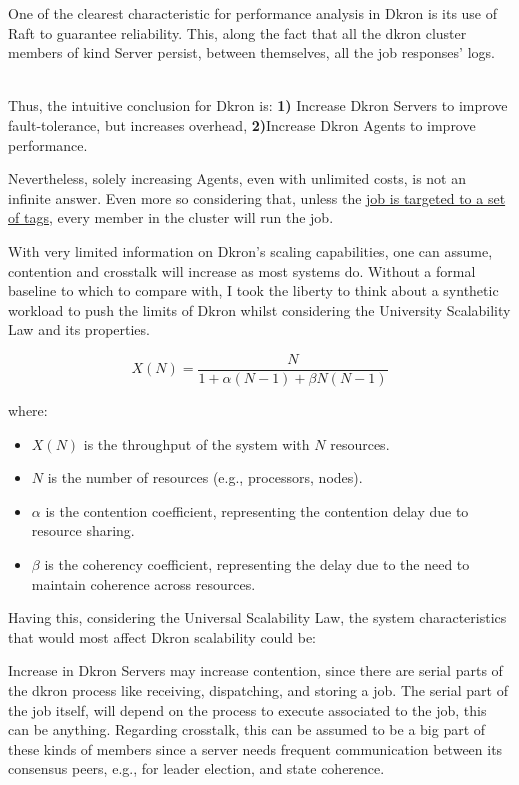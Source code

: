 \documentclass[runningheads]{llncs}
\begin{document}
One of the clearest characteristic for performance analysis in Dkron is its use of Raft to guarantee
reliability. This, along the fact that all the dkron cluster members of kind Server persist,
between themselves, all the job responses' logs.

~\\ Thus, the intuitive conclusion for Dkron is:
\textbf{1)} Increase Dkron Servers to improve fault-tolerance, but increases overhead,
\textbf{2)}Increase Dkron Agents to improve performance.


Nevertheless, solely increasing Agents, even with unlimited costs, is not an infinite answer.
Even more so considering that, unless the
\href{https://dkron.io/docs/usage/target-nodes-spec}{job is targeted to a set of tags},
every member in the cluster will run the job.

With very limited information on Dkron's scaling capabilities, one can assume, contention and crosstalk will increase as most systems do.
Without a formal baseline to which to compare with, I took the liberty to think about a synthetic workload
to push the limits of Dkron whilst considering the University Scalability Law and its properties.

\[
X(N) = \frac{N}{1 + \alpha (N - 1) + \beta N (N - 1)}
\]

where:
\begin{itemize}
    \item \( X(N) \) is the throughput of the system with \( N \) resources.
    \item \( N \) is the number of resources (e.g., processors, nodes).
    \item \( \alpha \) is the contention coefficient, representing the contention delay due to resource sharing.
    \item \( \beta \) is the coherency coefficient, representing the delay due to the need to maintain coherence across resources.
\end{itemize}

Having this, considering the Universal Scalability Law, the system characteristics that would most
affect Dkron scalability could be:

Increase in Dkron Servers may increase contention, since there are serial parts of the dkron process like
receiving, dispatching, and storing a job. The serial part of the job itself, will
depend on the process to execute associated to the job, this can be anything. Regarding
crosstalk, this can be assumed to be a big part of these kinds of members since
a server needs frequent communication between its consensus peers, e.g., for
leader election, and state coherence.
\end{document}
